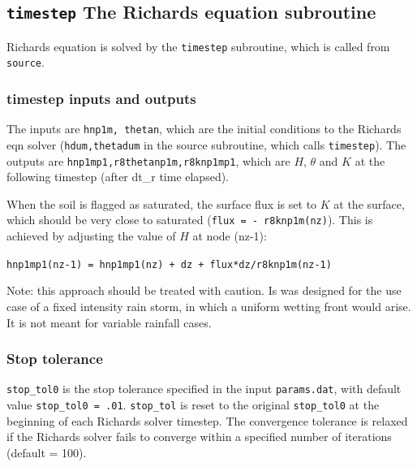 \documentclass{article}
\newcommand{\code}[1]{\texttt{#1}}
\begin{document}
\subsection{\code{timestep} The Richards equation subroutine }

Richards equation is solved by the \code{timestep} subroutine, which is called from \code{source}.
	
\subsubsection*{timestep inputs and outputs }
The inputs are \code{hnp1m, thetan}, which are the initial conditions to the Richards eqn solver (\code{hdum,thetadum} in the source subroutine, which calls \code{timestep}).  
The outputs are  \code{hnp1mp1,r8thetanp1m,r8knp1mp1}, which are  $H$, $\theta$ and $K$ at the following timestep (after dt\_r  time elapsed).



When the soil is flagged as saturated,  the surface flux is set to $K$ at the surface, which should be very close to saturated (\code{flux  = - r8knp1m(nz)}).  This is achieved by adjusting the value of $H$ at node (nz-1):
\begin{center}
\code{hnp1mp1(nz-1) = hnp1mp1(nz) + dz + flux*dz/r8knp1m(nz-1)}	
\end{center}

Note: this approach should be treated with caution.  Is was designed for the use case of a fixed intensity rain storm, in which a uniform wetting front would arise.  It is not meant for variable rainfall cases.

\subsubsection*{Stop tolerance }
\code{stop\_tol0} is the stop tolerance specified in the input \code{params.dat}, with default value \code{stop\_tol0 = .01}.  
\code{stop\_tol} is reset to the original \code{stop\_tol0}  at the beginning of each Richards solver timestep.  The convergence tolerance  is relaxed if the Richards solver fails to converge within a specified number of iterations (default = 100).

%
\end{document}
